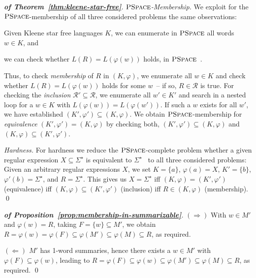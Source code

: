 \documentclass[envcountsame]{llncs}
\newcommand{\PSPACE}{\complexityclass{PSpace}}
\newcommand{\complexityclass}[1]{\ensuremath{\textsc{#1}}\xspace}
\newcommand{\rationalset}{\ensuremath{\mathcal{R}}\xspace}
\begin{document}
\begin{proof}[\textbf{of Theorem~\ref{thm:kleene-star-free}}]
  \emph{\PSPACE-Membership.} We exploit for the \PSPACE-membership of
  all three considered problems the same observations:
\begin{inparaenum}[\bfseries(1)]
  \item Given Kleene star free languages $K$, we can enumerate in
    \PSPACE all words $w\in K$,
and
  \item we can check whether $L(R)=L(\varphi(w))$ holds, in
    \PSPACE~\cite{DBLP:conf/focs/MeyerS72}.
  \end{inparaenum}
  
  Thus, to check \emph{membership} of $R$ in $(K,\varphi)$, we
  enumerate all $w\in K$ and check whether $L(R)=L(\varphi(w))$
  holds for some $w$~-- if so, $R\in\rationalset$ is true. 
For checking the \emph{inclusion}
  $\rationalset'\subseteq\rationalset$, we enumerate all $w'\in K'$
  and search in a nested loop for a $w\in K$ with
  $L(\varphi(w))=L(\varphi(w'))$.
If such a $w$ exists for all $w'$, we have established
  $(K',\varphi')\subseteq (K,\varphi)$.
We obtain \PSPACE-membership for \emph{equivalence} $(K',\varphi')=
  (K,\varphi)$ by checking both, $(K',\varphi')\subseteq (K,\varphi)$
  and $(K,\varphi)\subseteq (K',\varphi')$.



  \emph{Hardness.} For hardness we reduce the \PSPACE-complete problem
  whether a given regular expression $X\subseteq\Sigma^\star$ is
  equivalent to $\Sigma^\star$~\cite{DBLP:conf/focs/MeyerS72} to all three
  considered problems:
Given an arbitrary regular expressions $X$, we set $K=\{a\}$,
  $\varphi(a)=X$, $K'=\{b\}$, $\varphi'(b)=\Sigma^\star$, and
  $R=\Sigma^\star$.
This gives us $X=\Sigma^\star$ iff $(K,\varphi)=(K',\varphi')$
  (equivalence) iff $(K,\varphi)\subseteq(K',\varphi')$ (inclusion)
  iff $R\in(K,\varphi)$ (membership).
\qed
\end{proof}


\begin{proof}[\textbf{of Proposition~\ref{prop:membership-in-summarizable}}]
  $(\Rightarrow)$ With $w\in M'$ and $\varphi(w)=R$, taking
  $F=\{w\}\subseteq M'$, we obtain
  $R=\varphi(w)=\varphi(F)\subseteq\varphi(M')\subseteq
  \varphi(M)\subseteq R$, as required.


  $(\Leftarrow)$ $M'$ has 1-word summaries, hence there exists a $w\in
  M'$ with $\varphi(F)\subseteq\varphi(w)$, leading to
  $R=\varphi(F)\subseteq\varphi(w)\subseteq \varphi(M')\subseteq
  \varphi(M)\subseteq R$, as required.  \qed
\end{proof}
\end{document}
